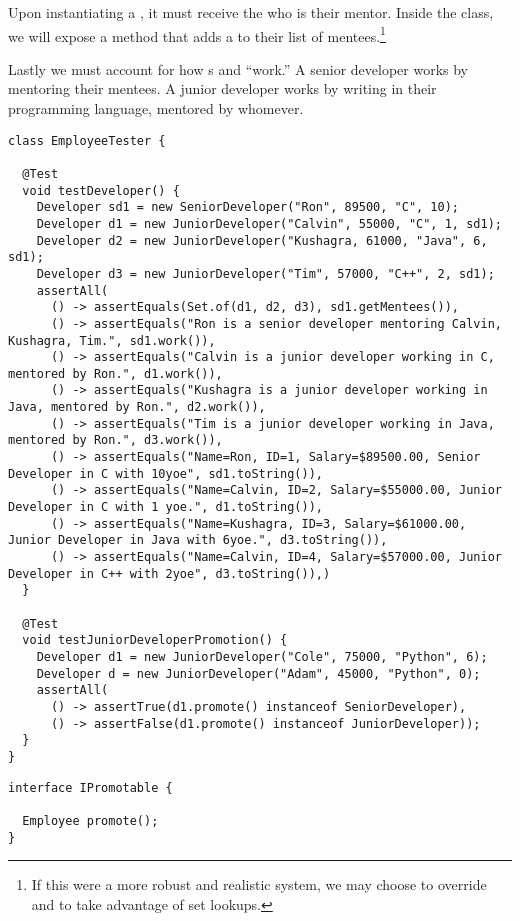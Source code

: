 Upon instantiating a , it must receive the  who is their mentor. Inside the  class, we will expose a method that adds a  to their list of mentees.\footnote{If this were a more robust and realistic system, we may choose to override  and  to take advantage of set lookups.}

Lastly we must account for how s and  ``work.'' A senior developer works by mentoring their mentees. A junior developer works by writing in their programming language, mentored by whomever.

\begin{lstlisting}[language=MyJava]
class EmployeeTester {
   
  @Test
  void testDeveloper() {
    Developer sd1 = new SeniorDeveloper("Ron", 89500, "C", 10);
    Developer d1 = new JuniorDeveloper("Calvin", 55000, "C", 1, sd1);
    Developer d2 = new JuniorDeveloper("Kushagra, 61000, "Java", 6, sd1);
    Developer d3 = new JuniorDeveloper("Tim", 57000, "C++", 2, sd1);
    assertAll(
      () -> assertEquals(Set.of(d1, d2, d3), sd1.getMentees()),
      () -> assertEquals("Ron is a senior developer mentoring Calvin, Kushagra, Tim.", sd1.work()),
      () -> assertEquals("Calvin is a junior developer working in C, mentored by Ron.", d1.work()),
      () -> assertEquals("Kushagra is a junior developer working in Java, mentored by Ron.", d2.work()),
      () -> assertEquals("Tim is a junior developer working in Java, mentored by Ron.", d3.work()),
      () -> assertEquals("Name=Ron, ID=1, Salary=$89500.00, Senior Developer in C with 10yoe", sd1.toString()),
      () -> assertEquals("Name=Calvin, ID=2, Salary=$55000.00, Junior Developer in C with 1 yoe.", d1.toString()),
      () -> assertEquals("Name=Kushagra, ID=3, Salary=$61000.00, Junior Developer in Java with 6yoe.", d3.toString()),
      () -> assertEquals("Name=Calvin, ID=4, Salary=$57000.00, Junior Developer in C++ with 2yoe", d3.toString()),)
  }

  @Test
  void testJuniorDeveloperPromotion() {
    Developer d1 = new JuniorDeveloper("Cole", 75000, "Python", 6);
    Developer d = new JuniorDeveloper("Adam", 45000, "Python", 0);
    assertAll(
      () -> assertTrue(d1.promote() instanceof SeniorDeveloper),
      () -> assertFalse(d1.promote() instanceof JuniorDeveloper));
  }
}
\end{lstlisting}

\begin{lstlisting}[language=MyJava]
interface IPromotable {

  Employee promote();
}
\end{lstlisting}

